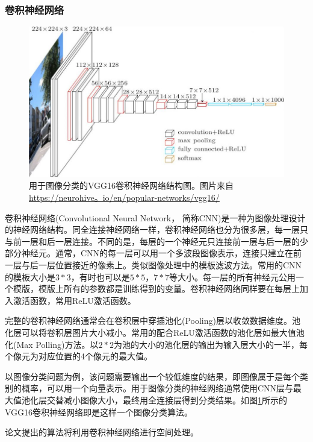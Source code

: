 \subsubsection{卷积神经网络}  \label{section:cnn}
\par
\begin{figure}[htbp!]
    \centering
    \includegraphics[width = 1.\textwidth]{chap/img/vgg16-neural-network.jpg}
    \caption{
        用于图像分类的VGG16\supercite{simonyan2014very}卷积神经网络结构图。图片来自 \url{https://neurohive。io/en/popular-networks/vgg16/}
        }\label{fig:vgg16_architecture}
\end{figure}
\par
卷积神经网络(Convolutional Neural Network， 简称CNN)是一种为图像处理设计的神经网络结构。同全连接神经网络一样，卷积神经网络也分为很多层，每一层只与前一层和后一层连接。不同的是，每层的一个神经元只连接前一层与后一层的少部分神经元。通常，CNN的每一层可以用一个多波段图像表示，连接只建立在前一层与后一层位置接近的像素上。类似图像处理中的模板滤波方法。常用的CNN的模板大小是$3*3$，有时也可以是$5*5$，$7*7$等大小。每一层的所有神经元公用一个模版，模版上所有的参数都是训练得到的变量。卷积神经网络同样要在每层上加入激活函数，常用ReLU激活函数。
\par
完整的卷积神经网络通常会在卷积层中穿插池化(Pooling)层以收敛数据维度。池化层可以将卷积层图片大小减小。常用的配合ReLU激活函数的池化层如最大值池化(Max Polling)方法。以$2*2$为池的大小的池化层的输出为输入层大小的一半，每个像元为对应位置的4个像元的最大值。
\par
以图像分类问题为例，该问题需要输出一个较低维度的结果，即图像属于是每个类别的概率，可以用一个向量表示。用于图像分类的神经网络通常使用CNN层与最大值池化层交替减小图像大小，最终用全连接层得到分类结果。如图\ref{fig:vgg16_architecture}所示的VGG16\supercite{simonyan2014very}卷积神经网络即是这样一个图像分类算法。
\par
论文提出的算法将利用卷积神经网络进行空间处理。
\par
